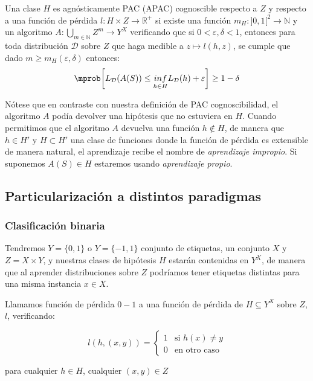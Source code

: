 \begin{definition}
Una clase $H$ es agnósticamente PAC (APAC) cognoscible respecto a $Z$ y respecto a una función de pérdida 
$l: H \times Z \rightarrow \mathbb{R}^{+}$ si existe una función 
$m_{H} : ]0,1[^2\rightarrow \mathbb{N}$ y un algoritmo 
$A: \underset{m\in \mathbb{N}}{\bigcup} Z^m \rightarrow Y^X$ verificando que si 
$0 < \varepsilon, \delta < 1$, entonces para toda distribución $\mathcal{D}$ sobre $Z$ que haga medible a $z \mapsto l(h, z)$,
se cumple que dado $m\ge m_{H}(\varepsilon, \delta)$ entonces:
\[\mprob \bigg[L_{\mathcal{D}}(A(S)) \le \underset{h\in H}{inf} L_{\mathcal{D}}(h) + \varepsilon \bigg] \ge 1-\delta\]
\end{definition}

Nótese que en contraste con nuestra definición de PAC cognoscibilidad, el algoritmo $A$ podía devolver una 
hipótesis que no estuviera en $H$. Cuando permitimos que el algoritmo $A$ devuelva una función 
$h \notin H$, de manera que $h \in H'$ y  $H \subset H'$ una clase de funciones donde la función de pérdida 
es extensible de manera natural, el aprendizaje recibe el nombre de \textit{aprendizaje impropio}. Si suponemos
$A(S) \in H$ estaremos usando \textit{aprendizaje propio}.

\subsection{Particularización a distintos paradigmas}

\subsubsection{Clasificación binaria}
\label{sec:clas-binaria}

Tendremos $Y=\{0,1\}$ o $Y=\{-1,1\}$ conjunto de etiquetas, un conjunto $X$ y $Z=X\times Y$, y nuestras clases
de hipótesis $H$ estarán contenidas en $Y^X$, de manera que al aprender distribuciones sobre $Z$ podríamos 
tener etiquetas distintas para una misma instancia $x \in X$.

\begin{definition}
Llamamos función de pérdida $0-1$ a una función de pérdida de $H\subseteq Y^X$ sobre $Z$, $l$, verificando:
 
 \[l(h, (x,y)) = \left\{\begin{array}{ll}
                         1 & \textrm{si } h(x)\neq y\\
                         0 & \textrm{en otro caso}
                        \end{array}\right.\]

para cualquier $h\in H$, cualquier $(x,y) \in Z$
\label{def:zero-one-loss}
\end{definition}

